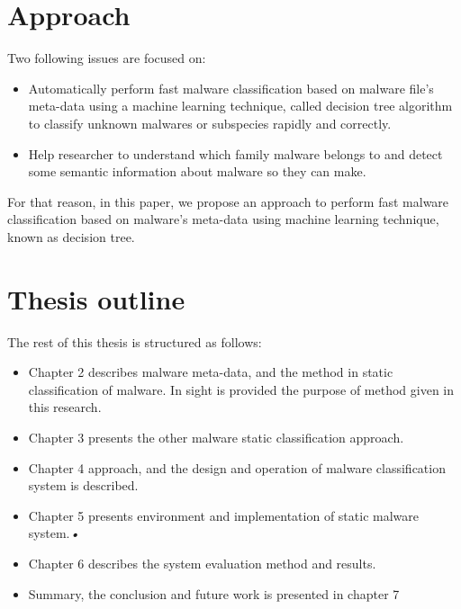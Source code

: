 \section{Approach}Two following issues are focused on:\\
\begin{itemize}
\item Automatically perform fast malware classification based on malware file's meta-data using a machine learning technique, called decision tree algorithm to classify unknown malwares or subspecies rapidly and correctly.
\item Help researcher to understand which family malware belongs to and detect some semantic information about malware so they can make.
\end{itemize}
For that reason, in this paper, we propose an approach to perform fast malware classification based on malware's meta-data using machine learning technique, known as decision tree.
\section{Thesis outline}
The rest of this thesis is structured as follows: \begin{itemize}
\item Chapter 2 describes malware meta-data, and the method in static classification of malware. In sight is provided the purpose of method given in this research.
\item Chapter 3 presents the other malware static classification approach.
\item Chapter 4 approach, and the design and operation of malware classification system is described.
\item Chapter 5 presents environment and implementation of static malware system.\textsl{•} 
\item Chapter 6 describes the system evaluation method and results. 
\item Summary, the conclusion and future work is presented in chapter 7
\end{itemize}
